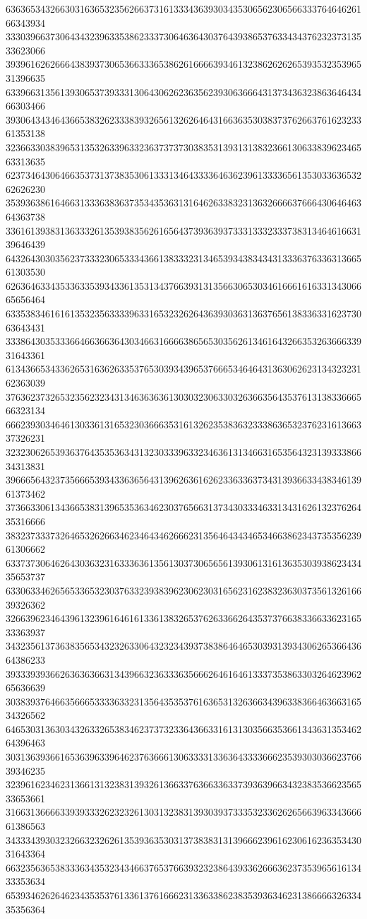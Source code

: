 63636534326630316365323562663731613334363930343530656230656633376464626166343934
33303966373064343239633538623337306463643037643938653763343437623237313533623066
39396162626664383937306536633365386261666639346132386262626539353235396531396635
63396631356139306537393331306430626236356239306366643137343632386364643466303466
39306434346436653832623338393265613262646431663635303837376266376162323361353138
32366330383965313532633963323637373730383531393131383236613063383962346563313635
62373464306466353731373835306133313464333364636239613333656135303363653262626230
35393638616466313336383637353435363131646263383231363266663766643064646364363738
33616139383136333261353938356261656437393639373331333233373831346461663139646439
64326430303562373332306533343661383332313465393438343431333637633631366561303530
62636463343533633539343361353134376639313135663065303461666161633134306665656464
63353834616161353235633339633165323262643639303631363765613833633162373063643431
33386430353336646636636430346631666638656530356261346164326635326366633931643361
61343665343362653163626335376530393439653766653464643136306262313432323162363039
37636237326532356232343134636363613030323063303263663564353761313833666566323134
66623930346461303361316532303666353161326235383632333863653237623161366337326231
32323062653936376435353634313230333963323463613134663165356432313933386634313831
39666564323735666539343363656431396263616262336336373431393663343834613961373462
37366330613436653831396535363462303765663137343033346331343162613237626435316666
38323733373264653262663462346434626662313564643434653466386234373535623961306662
63373730646264303632316333636135613037306565613930613161363530393862343435653737
63306334626565336532303763323938396230623031656231623832363037356132616639326362
32663962346439613239616461613361383265376263366264353737663833663362316533363937
34323561373638356534323263306432323439373838646465303931393430626536643664386233
39333939366263636366313439663236333635666264616461333735386330326462396265636639
30383937646635666533336332313564353537616365313263663439633836646366316534326562
64653031363034326332653834623737323364366331613130356635366134363135346264396463
30313639366165363963396462376366613063333133636433336662353930303662376639346235
32396162346231366131323831393261366337636633633739363966343238353662356533653661
31663136666339393332623232613031323831393039373335323362626566396334366661386563
34333439303232663232626135393635303137383831313966623961623061623635343031643364
66323563653833363435323434663765376639323238643933626663623735396561613433353634
65393462626462343535376133613761666231336338623835393634623138666632633435356364
